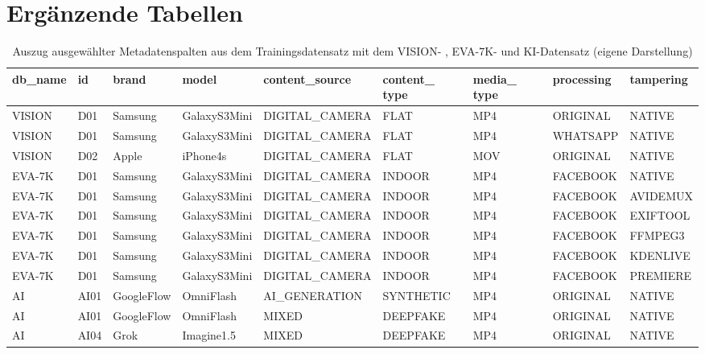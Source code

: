 \chapter{Ergänzende Tabellen}
\label{sec:ergaenztabellen}


\begin{table}
    \centering
    \small
    \begin{tabular}{lllllllll}\hline
         \textbf{db\_name} & \textbf{id} & \textbf{brand} & \textbf{model} & \textbf{content\_source} & \textbf{content\_
type}& \textbf{media\_
type}& \textbf{processing} & \textbf{tampering} \\\hline
         VISION & D01 & Samsung & GalaxyS3Mini & DIGITAL\_CAMERA & FLAT & MP4 & ORIGINAL & NATIVE \\\hline
         VISION & D01 & Samsung & GalaxyS3Mini & DIGITAL\_CAMERA & FLAT & MP4 & WHATSAPP & NATIVE \\\hline
         VISION & D02 & Apple & iPhone4s & DIGITAL\_CAMERA & FLAT & MOV & ORIGINAL & NATIVE \\\hline
         EVA-7K & D01 & Samsung & GalaxyS3Mini & DIGITAL\_CAMERA & INDOOR & MP4 & FACEBOOK & NATIVE \\\hline
         EVA-7K & D01 & Samsung & GalaxyS3Mini & DIGITAL\_CAMERA & INDOOR & MP4 & FACEBOOK & AVIDEMUX \\\hline
         EVA-7K & D01 & Samsung & GalaxyS3Mini & DIGITAL\_CAMERA & INDOOR & MP4 & FACEBOOK & EXIFTOOL \\\hline
         EVA-7K & D01 & Samsung & GalaxyS3Mini & DIGITAL\_CAMERA & INDOOR & MP4 & FACEBOOK & FFMPEG3 \\\hline
         EVA-7K & D01 & Samsung & GalaxyS3Mini & DIGITAL\_CAMERA & INDOOR & MP4 & FACEBOOK & KDENLIVE \\\hline
         EVA-7K & D01 & Samsung & GalaxyS3Mini & DIGITAL\_CAMERA & INDOOR & MP4 & FACEBOOK & PREMIERE \\\hline
         AI & AI01 & GoogleFlow & OmniFlash & AI\_GENERATION & SYNTHETIC & MP4 & ORIGINAL & NATIVE \\\hline
         AI & AI01 & GoogleFlow & OmniFlash & MIXED & DEEPFAKE & MP4 & ORIGINAL & NATIVE \\\hline
         AI & AI04 & Grok & Imagine1.5 & MIXED & DEEPFAKE & MP4 & ORIGINAL & NATIVE \\\hline
    \end{tabular}
\caption{Auszug ausgewählter Metadatenspalten aus dem Trainingsdatensatz mit dem VISION- \cite{shullani_vision_2017} , EVA-7K- \cite{yang_efficient_2020} und KI-Datensatz (eigene Darstellung)}
\label{tab:train}
\end{table}



